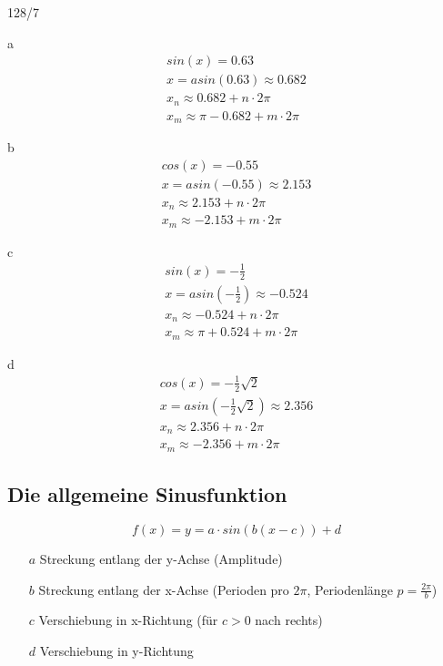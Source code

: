 \begin{exercise}{128/7}
  \item [a]
  \begin{gather*}
    sin(x) = 0.63 \\
    x = asin(0.63) \approx 0.682 \\
    x_n \approx 0.682 + n \cdot 2\pi \\
    x_m \approx \pi - 0.682 + m \cdot 2\pi
  \end{gather*}
  \item [b]
  \begin{gather*}
    cos(x) = -0.55 \\
    x = asin(-0.55) \approx 2.153 \\
    x_n \approx 2.153 + n \cdot 2\pi \\
    x_m \approx -2.153 + m \cdot 2\pi
  \end{gather*}
  \item [c]
  \begin{gather*}
    sin(x) = -\frac{1}{2} \\
    x = asin(-\frac{1}{2}) \approx -0.524 \\
    x_n \approx -0.524 + n \cdot 2\pi \\
    x_m \approx \pi + 0.524 + m \cdot 2\pi
  \end{gather*}
  \item [d]
  \begin{gather*}
    cos(x) = -\frac{1}{2}\sqrt{2} \\
    x = asin(-\frac{1}{2}\sqrt{2}) \approx 2.356 \\
    x_n \approx 2.356 + n \cdot 2\pi \\
    x_m \approx -2.356 + m \cdot 2\pi
  \end{gather*}
\end{exercise}
\subsection{Die allgemeine Sinusfunktion}
$$f(x) = y = a \cdot sin(b(x - c)) + d$$
\begin{itemize}
  \item [$a$] Streckung entlang der y-Achse (Amplitude)
  \item [$b$] Streckung entlang der x-Achse (Perioden pro $2\pi$, Periodenlänge $p = \frac{2\pi}{b}$)
  \item [$c$] Verschiebung in x-Richtung (für $c > 0$ nach rechts)
  \item [$d$] Verschiebung in y-Richtung
\end{itemize}
\newpage
